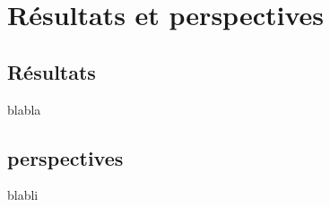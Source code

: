 \section{Résultats et perspectives}

\subsection{Résultats}
\begin{frame}{blabla}
    
\end{frame}

\subsection{perspectives} 
\begin{frame}{blabli}
    
\end{frame}